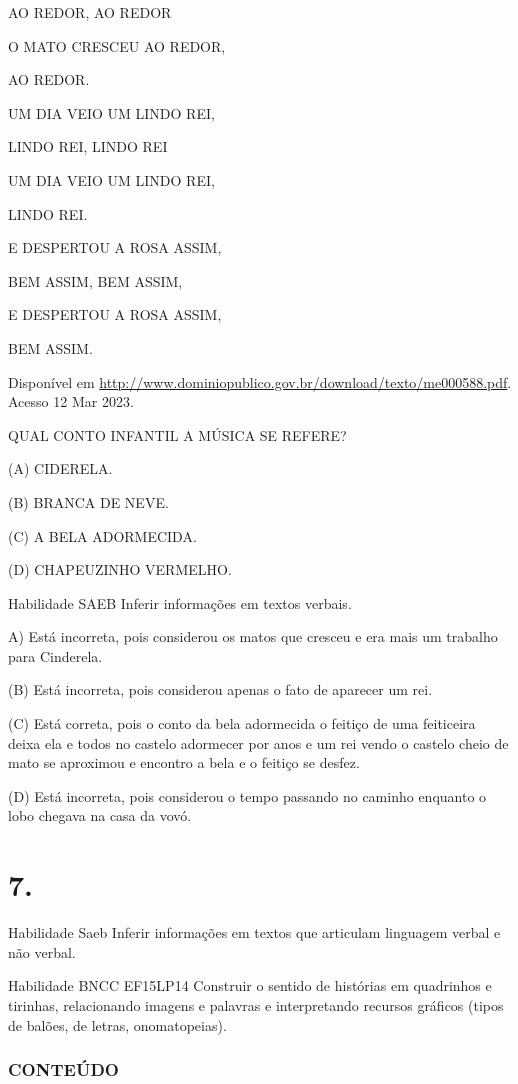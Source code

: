 {{AO REDOR, AO REDOR

O MATO CRESCEU AO REDOR,

AO REDOR.

UM DIA VEIO UM LINDO REI,

LINDO REI, LINDO REI

UM DIA VEIO UM LINDO REI,

LINDO REI.

E DESPERTOU A ROSA ASSIM,

BEM ASSIM, BEM ASSIM,

E DESPERTOU A ROSA ASSIM,

BEM ASSIM.

Disponível em
\url{http://www.dominiopublico.gov.br/download/texto/me000588.pdf}.
Acesso 12 Mar 2023.

QUAL CONTO INFANTIL A MÚSICA SE REFERE?

(A) CIDERELA.

(B) BRANCA DE NEVE.

(C) A BELA ADORMECIDA.

(D) CHAPEUZINHO VERMELHO.

Habilidade SAEB Inferir informações em textos verbais.

A) Está incorreta, pois considerou os matos que cresceu e era mais um
trabalho para Cinderela.

(B) Está incorreta, pois considerou apenas o fato de aparecer um rei.

(C) Está correta, pois o conto da bela adormecida o feitiço de uma
feiticeira deixa ela e todos no castelo adormecer por anos e um rei
vendo o castelo cheio de mato se aproximou e encontro a bela e o feitiço
se desfez.

(D) Está incorreta, pois considerou o tempo passando no caminho enquanto
o lobo chegava na casa da
vovó.\protect\hypertarget{_heading=h.ha8xhwafzqp2}{}{\protect\hypertarget{_heading=h.7wgwl7ctcj2x}{}{}}

\chapter{7.}

Habilidade Saeb Inferir informações em textos que articulam linguagem
verbal e não verbal.

Habilidade BNCC EF15LP14 Construir o sentido de histórias em quadrinhos
e tirinhas, relacionando imagens e palavras e interpretando recursos
gráficos (tipos de balões, de letras, onomatopeias).

\subsection{CONTEÚDO}

}}
